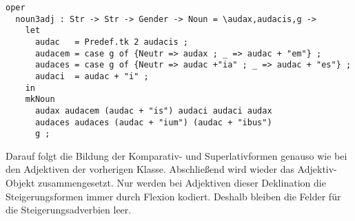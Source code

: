 \begin{lstlisting}[float=h!tp,caption={Deklinationsfunktion für die "`Nomenformen"' der Adjektive der dritten Deklination (vgl. \textbf{ResLat.gf})},label={GF-Res-Noun3Adj},basicstyle=\small]
oper
  noun3adj : Str -> Str -> Gender -> Noun = \audax,audacis,g ->
    let 
      audac   = Predef.tk 2 audacis ;
      audacem = case g of {Neutr => audax ; _ => audac + "em"} ;
      audaces = case g of {Neutr => audac +"ia" ; _ => audac + "es"} ;
      audaci  = audac + "i" ;
    in
    mkNoun
      audax audacem (audac + "is") audaci audaci audax
      audaces audaces (audac + "ium") (audac + "ibus") 
      g ;
\end{lstlisting}
Darauf folgt die Bildung der Komparativ- und Superlativformen genauso wie bei den Adjektiven der vorherigen Klasse. Abschließend wird wieder das Adjektiv-Objekt zusammengesetzt. Nur werden bei Adjektiven dieser Deklination die Steigerungsformen immer durch Flexion kodiert. Deshalb bleiben die Felder für die Steigerungsadverbien leer.
